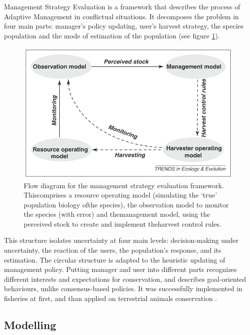 \documentclass[12pt,a4paper]{article}
\begin{document}
Management Strategy Evaluation is a framework that describes the process of Adaptive Management in conflictual situations.
It decomposes the problem in four main parts: manager's policy updating, user's harvest strategy, the species population and the mode of estimation of the population (see figure \ref{msediagram}).
\begin{figure}
	\centering
	\includegraphics[scale=0.5]{msediagram.png}
	\caption{Flow diagram for the management strategy evaluation framework. Thiscomprises a resource operating model (simulating the ‘true’ population biology ofthe species), the observation model to monitor the species (with error) and themanagement model, using the perceived stock to create and implement theharvest control rules. \citep{BUNNEFELD2011441}}
	\label{msediagram}
\end{figure}
This structure isolates uncertainty at four main levels: decision-making under uncertainty, the reaction of the users, the population's response,
and its estimation.
The circular structure is adapted to the heuristic updating of management policy.
Putting manager and user into different parts recognizes different interests and expectations for conservation, and describes goal-oriented behaviours, unlike consensus-based policies.
It was successfully implemented in fisheries at first, and than applied on terrestrial animals conservation \citep{BUNNEFELD2011441, bunnefeld2013incentivizing}.

\subsection{Modelling}
\end{document}
